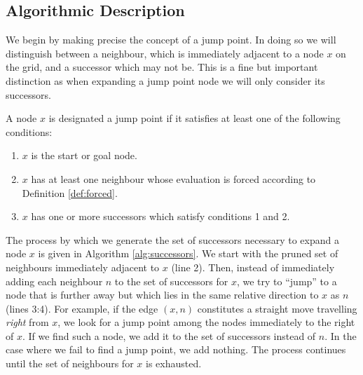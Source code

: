 \subsection{Algorithmic Description}
We begin by making precise the concept of a jump point.  
In doing so we will distinguish between a neighbour, which is immediately
adjacent to a node $x$ on the grid, and a successor which may not be.
This is a fine but important distinction as when expanding a jump point node
we will only consider its successors.

\begin{definition}
\label{def:jump}
A node $x$ is designated a jump point if it satisfies at least one of the following
conditions:
\begin{enumerate}
\item{$x$ is the start or goal node.}
\item{$x$ has at least one neighbour
whose evaluation is forced according to Definition \ref{def:forced}.}
\item{$x$ has one or more successors which satisfy conditions 1 and 2.}
\end{enumerate}
\end{definition}



The process by which we generate the set of successors necessary to expand a
node $x$ is given in Algorithm \ref{alg:successors}.
We start with the pruned set of neighbours immediately adjacent to $x$ (line 2).
Then, instead of immediately adding each neighbour $n$ to the set of successors
for $x$, we try to ``jump'' to a node that is further away but which lies in the 
same relative direction to $x$ as $n$ (lines 3:4). 
For example, if the edge $(x, n)$ constitutes a
straight move travelling \emph{right} from $x$, we look for a jump point among
the nodes immediately to the right of $x$.
If we find such a node, we add it to the set of successors instead of $n$.
In the case where we fail to find a jump point, we add nothing.
The process continues until the set of neighbours for $x$ is exhausted.

